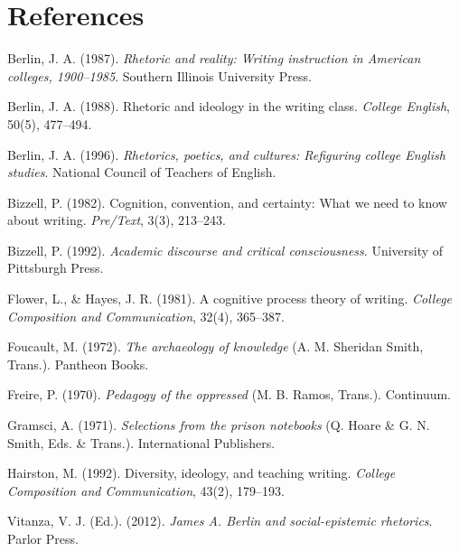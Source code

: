 \documentclass[12pt]{article}
\begin{document}
\section*{References}

Berlin, J. A. (1987). \textit{Rhetoric and reality: Writing instruction in American colleges, 1900--1985}. Southern Illinois University Press.

Berlin, J. A. (1988). Rhetoric and ideology in the writing class. \textit{College English}, 50(5), 477--494.

Berlin, J. A. (1996). \textit{Rhetorics, poetics, and cultures: Refiguring college English studies}. National Council of Teachers of English.

Bizzell, P. (1982). Cognition, convention, and certainty: What we need to know about writing. \textit{Pre/Text}, 3(3), 213--243.

Bizzell, P. (1992). \textit{Academic discourse and critical consciousness}. University of Pittsburgh Press.

Flower, L., \& Hayes, J. R. (1981). A cognitive process theory of writing. \textit{College Composition and Communication}, 32(4), 365--387.

Foucault, M. (1972). \textit{The archaeology of knowledge} (A. M. Sheridan Smith, Trans.). Pantheon Books.

Freire, P. (1970). \textit{Pedagogy of the oppressed} (M. B. Ramos, Trans.). Continuum.

Gramsci, A. (1971). \textit{Selections from the prison notebooks} (Q. Hoare \& G. N. Smith, Eds. \& Trans.). International Publishers.

Hairston, M. (1992). Diversity, ideology, and teaching writing. \textit{College Composition and Communication}, 43(2), 179--193.

Vitanza, V. J. (Ed.). (2012). \textit{James A. Berlin and social-epistemic rhetorics}. Parlor Press.
\end{document}
